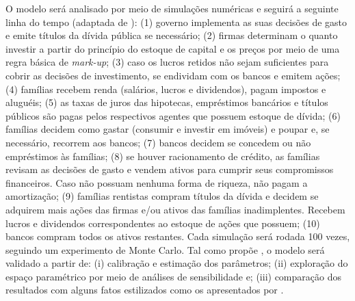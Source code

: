 O modelo será analisado por meio de simulações numéricas e seguirá a seguinte linha do tempo (adaptada de \textcite{botta_when_2019}):
    (1) governo implementa as suas decisões de gasto e emite títulos da dívida pública se necessário;
    (2) firmas determinam o quanto investir a partir do princípio do estoque de capital e os preços por meio de uma regra básica de \textit{mark-up};
    (3) caso os lucros retidos não sejam suficientes para cobrir as decisões de investimento, se endividam com os bancos e  emitem ações;
    (4) famílias recebem renda (salários, lucros e dividendos), pagam impostos e  aluguéis; 
    (5) as taxas de juros das hipotecas, empréstimos bancários e títulos públicos são pagas pelos respectivos agentes que possuem estoque de dívida;
    (6) famílias decidem como gastar (consumir e investir em imóveis) e poupar e, se necessário, recorrem aos bancos;
    (7) bancos decidem se concedem ou não empréstimos às famílias;
    (8) se houver racionamento de crédito, as famílias revisam as decisões de gasto e vendem ativos para cumprir seus compromissos financeiros.
    Caso não possuam nenhuma forma de riqueza, não pagam a amortização; %
    (9) famílias rentistas compram títulos da dívida e decidem se adquirem mais ações das firmas e/ou ativos das famílias inadimplentes. Recebem lucros e dividendos correspondentes ao estoque de ações que possuem;
    (10) bancos compram todos os ativos restantes.
Cada simulação será rodada 100 vezes, seguindo um experimento de Monte Carlo.
Tal como propõe \textcite{fagiolo_validation_2019}, o modelo será validado a partir de: 
    (i) calibração e estimação dos parâmetros;
    (ii) exploração do espaço paramétrico por meio de análises de sensibilidade e;
    (iii) comparação dos resultados com alguns fatos estilizados como os apresentados por \textcite{petrini_demanda_2019}.


